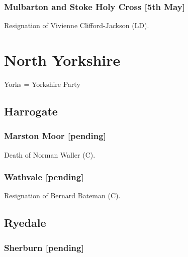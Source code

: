 \documentclass[a4paper,openany]{book}
\begin{document}
\begin{resultsiii}
\subsubsection*{Mulbarton and Stoke Holy Cross \hspace*{\fill}\nolinebreak[1]%
	\enspace\hspace*{\fill}
	[5th May]}


Resignation of Vivienne Clifford-Jackson (LD).

\section{North Yorkshire}

Yorks = Yorkshire Party

\subsection*{Harrogate}

\subsubsection*{Marston Moor \hspace*{\fill}\nolinebreak[1]%
	\enspace\hspace*{\fill}
	[pending]}


Death of Norman Waller (C).%

\subsubsection*{Wathvale \hspace*{\fill}\nolinebreak[1]%
	\enspace\hspace*{\fill}
	[pending]}


Resignation of Bernard Bateman (C).%

\subsection*{Ryedale}

\subsubsection*{Sherburn \hspace*{\fill}\nolinebreak[1]%
	\enspace\hspace*{\fill}
	[pending]}


\end{resultsiii}
\end{document}
